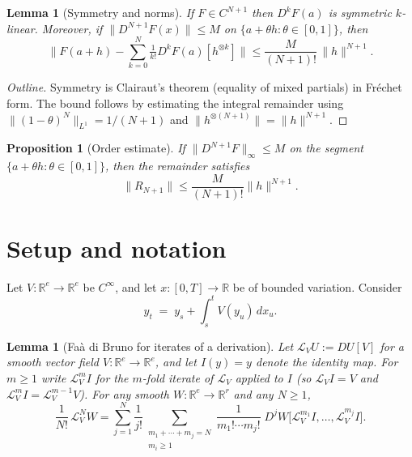 \documentclass[12pt]{article}
\newtheorem{proposition}[theorem]{Proposition}
\newtheorem{lemma}[theorem]{Lemma}
\theoremstyle{remark}
\begin{document}
\begin{lemma}[Symmetry and norms]
If $F\in C^{N+1}$ then $D^kF(a)$ is symmetric $k$-linear. Moreover, if
$\|D^{N+1}F(x)\|\le M$ on $\{a+\theta h:\theta\in[0,1]\}$, then
\[
\big\|F(a+h)-\sum_{k=0}^{N}\tfrac{1}{k!}D^kF(a)[h^{\otimes k}]\big\|
\le \frac{M}{(N+1)!}\,\|h\|^{N+1}.
\]
\end{lemma}

\begin{proof}[Outline]
Symmetry is Clairaut’s theorem (equality of mixed partials) in Fr\'echet form. The bound follows by estimating the integral remainder using $\|(1-\theta)^N\|_{L^1}=1/(N+1)$ and $\|h^{\otimes (N+1)}\|=\|h\|^{N+1}$.
\end{proof}

\begin{proposition}[Order estimate]
If $\|D^{N+1}F\|_\infty \le M$ on the segment $\{a+\theta h: \theta\in[0,1]\}$, 
then the remainder satisfies 
\[
\|R_{N+1}\| \le \frac{M}{(N+1)!} \|h\|^{N+1}.
\]
\end{proposition}

\section*{Setup and notation}
Let $V:\mathbb{R}^e\to\mathbb{R}^e$ be $C^\infty$, and let $x:[0,T]\to\mathbb{R}$ be of bounded variation. Consider
\[
y_t \;=\; y_s + \int_s^t V(y_u)\,dx_u .
\]

\begin{lemma}[Fa\`a di Bruno for iterates of a derivation]\label{lem:FDB-L-general} 
Let $\mathcal{L}_V U := DU[V]$ for a smooth vector field $V:\mathbb{R}^e\to\mathbb{R}^e$, and let $I(y)=y$ denote the identity map. For $m\ge1$ write $\mathcal{L}_V^{m}I$ for the $m$-fold iterate of $\mathcal{L}_V$ applied to $I$ (so $\mathcal{L}_V I=V$ and $\mathcal{L}_V^{m}I=\mathcal{L}_V^{m-1}V$).
For any smooth $W:\mathbb{R}^e\to\mathbb{R}^r$ and any $N\ge1$,
\[
\boxed{\;
\frac{1}{N!}\,\mathcal{L}_V^{N}W
=\sum_{j=1}^{N}\frac{1}{j!}\!\!\sum_{\substack{m_1+\cdots+m_j=N\\ m_i\ge1}}
\frac{1}{m_1!\cdots m_j!}\;
D^{j}W\big[\mathcal{L}_V^{m_1}I,\ldots,\mathcal{L}_V^{m_j}I\big].\;}
\]
\end{lemma}
\end{document}
